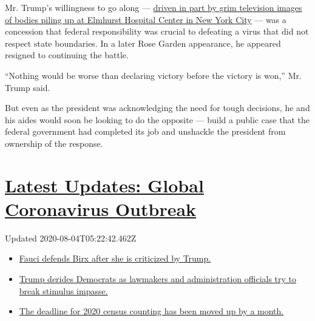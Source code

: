 Mr. Trump's willingness to go along ---
\href{https://www.nytimes.com/2020/03/30/us/politics/trump-coronavirus.html}{driven
in part by grim television images of bodies piling up at Elmhurst
Hospital Center in New York City} --- was a concession that federal
responsibility was crucial to defeating a virus that did not respect
state boundaries. In a later Rose Garden appearance, he appeared
resigned to continuing the battle.

``Nothing would be worse than declaring victory before the victory is
won,'' Mr. Trump said.

But even as the president was acknowledging the need for tough
decisions, he and his aides would soon be looking to do the opposite ---
build a public case that the federal government had completed its job
and unshackle the president from ownership of the response.

\hypertarget{latest-updates-global-coronavirus-outbreak}{%
\section{\texorpdfstring{\href{https://www.nytimes.com/2020/08/03/world/coronavirus-covid-19.html?action=click\&pgtype=Article\&state=default\&region=MAIN_CONTENT_1\&context=storylines_live_updates}{Latest
Updates: Global Coronavirus
Outbreak}}{Latest Updates: Global Coronavirus Outbreak}}\label{latest-updates-global-coronavirus-outbreak}}

Updated 2020-08-04T05:22:42.462Z

\begin{itemize}
\tightlist
\item
  \href{https://www.nytimes.com/2020/08/03/world/coronavirus-covid-19.html?action=click\&pgtype=Article\&state=default\&region=MAIN_CONTENT_1\&context=storylines_live_updates\#link-4547638f}{Fauci
  defends Birx after she is criticized by Trump.}
\item
  \href{https://www.nytimes.com/2020/08/03/world/coronavirus-covid-19.html?action=click\&pgtype=Article\&state=default\&region=MAIN_CONTENT_1\&context=storylines_live_updates\#link-15e7f995}{Trump
  derides Democrats as lawmakers and administration officials try to
  break stimulus impasse.}
\item
  \href{https://www.nytimes.com/2020/08/03/world/coronavirus-covid-19.html?action=click\&pgtype=Article\&state=default\&region=MAIN_CONTENT_1\&context=storylines_live_updates\#link-e5a2cda}{The
  deadline for 2020 census counting has been moved up by a month.}
\end{itemize}


